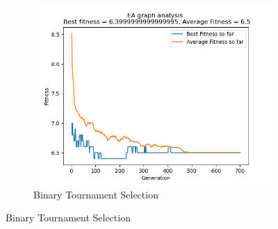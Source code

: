\documentclass[conference,compsoc]{IEEEtran}
\begin{document}
\begin{figure}[h]
\begin{subfigure}{0.34\textwidth}
  \end{subfigure}
  \begin{subfigure}{0.34\textwidth}
    \includegraphics[width=\linewidth]{../Results/_11_BT_Truncation_100_50_700.png}
    \caption{Binary Tournament Selection}
  \end{subfigure}
  \label{fig:graphs1}
\end{figure}
\end{document}
